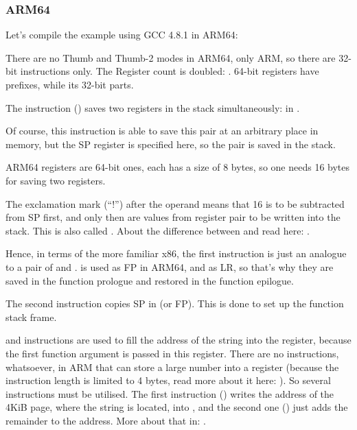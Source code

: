 ﻿\subsubsection{ARM64}


Let's compile the example using GCC 4.8.1 in ARM64:



There are no Thumb and Thumb-2 modes in ARM64, only ARM, so there are 32-bit instructions only.
The Register count is doubled: .
64-bit registers have  prefixes, while its 32-bit parts\EMDASH{}.

The  instruction () 
saves two registers in the stack simultaneously:  in .

Of course, this instruction is able to save this pair at an arbitrary place in memory, 
but the \ac{SP} register is specified here, so the pair is saved in the stack.

ARM64 registers are 64-bit ones, each has a size of 8 bytes, so one needs 16 bytes for saving two registers.

The exclamation mark (``!'') after the operand means that 16 is to be subtracted from \ac{SP} first, and only then
are values from register pair to be written into the stack.
This is also called .
About the difference between  and  
read here: .

Hence, in terms of the more familiar x86, the first instruction is just an analogue to a pair of
 and .
 is used as \ac{FP} in ARM64, and  
as \ac{LR}, so that's why they are saved in the function prologue and restored in the function epilogue.

The second instruction copies \ac{SP} in  (or \ac{FP}).
This is done to set up the function stack frame.

\label{pointers_ADRP_and_ADD}
 and \ADD instructions are used to fill the 
address of the string  into the  register, 
because the first function argument is passed
in this register.
There are no instructions, whatsoever, in ARM that can store a large number into a register (because the instruction
length is limited to 4 bytes, read more about it here: ).
So several instructions must be utilised.  The first instruction () writes the address of the 4KiB page, where the string is
located, into , 
and the second one (\ADD) just adds the remainder to the address.
More about that in: .

